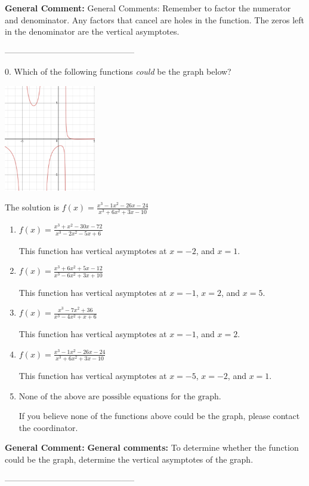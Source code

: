 \documentclass{extbook}[14pt]
\begin{document}
\textbf{General Comment:} General Comments: Remember to factor the numerator and denominator. Any factors that cancel are holes in the function. The zeros left in the denominator are the vertical asymptotes. 

-----------------------------------------------

0. Which of the following functions \textit{could} be the graph below?
\begin{center} \includegraphics[width=0.3\textwidth]{../Figures/identifyGraphOfRationalFunctionC.png} \end{center} 

The solution is $ f(x) = \frac{x^{3} -1 x^{2} -26 x -24}{x^{3} +6 x^{2} +3 x -10} $ 

\begin{enumerate}[label=\Alph*.] 
\item $ f(x) = \frac{x^{3} + x^{2} -30 x -72}{x^{3} -2 x^{2} -5 x + 6} $ 

 This function has vertical asymptotes at $x=-2$, and $x=1$. 
\item $ f(x) = \frac{x^{3} +6 x^{2} +5 x -12}{x^{3} -6 x^{2} +3 x + 10} $ 

 This function has vertical asymptotes at $x=-1$, $x=2$, and $x=5$. 
\item $ f(x) = \frac{x^{3} -7 x^{2} + 36}{x^{3} -4 x^{2} +x + 6} $ 

 This function has vertical asymptotes at $x=-1$, and $x=2$. 
\item $ f(x) = \frac{x^{3} -1 x^{2} -26 x -24}{x^{3} +6 x^{2} +3 x -10} $ 

 This function has vertical asymptotes at $x=-5$, $x=-2$, and $x=1$. 
\item $ \text{None of the above are possible equations for the graph.} $ 

 If you believe none of the functions above could be the graph, please contact the coordinator. 
\end{enumerate} 
 
\textbf{General Comment:} \textbf{General comments:} To determine whether the function could be the graph, determine the vertical asymptotes of the graph. 

-----------------------------------------------
\end{document}
